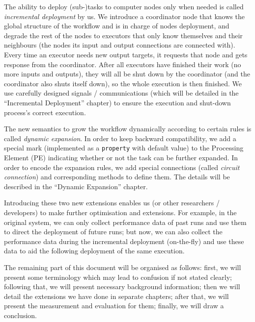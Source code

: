 The ability to deploy (sub-)tasks to computer nodes only when needed is called \emph{incremental deployment} by us. We introduce a coordinator node that knows the global structure of the workflow and is in charge of nodes deployment, and degrade the rest of the nodes to executors that only know themselves and their neighbours (\ie the nodes its input and output connections are connected with). Every time an executor needs new output targets, it requests that node and gets response from the coordinator. After all executors have finished their work (\ie no more inputs and outputs), they will all be shut down by the coordinator (and the coordinator also shuts itself down), so the whole execution is then finished. We use carefully designed signals / communications (which will be detailed in the ``Incremental Deployment'' chapter) to ensure the execution and shut-down process's correct execution.

The new semantics to grow the workflow dynamically according to certain rules is called \emph{dynamic expansion}. In order to keep backward compatibility, we add a special mark (implemented as a \lstinline|property| with default value) to the Processing Element (PE) indicating whether or not the task can be further expanded. In order to encode the expansion rules, we add special connections (called \emph{circuit connection}) and corresponding methods to define them. The details will be described in the ``Dynamic Expansion'' chapter.

Introducing these two new extensions enables us (or other researchers / developers) to make further optimisation and extensions. For example, in the original \dpy system, we can only collect performance data of past runs and use them to direct the deployment of future runs; but now, we can also collect the performance data during the incremental deployment (\ie on-the-fly) and use these data to aid the following deployment of the same execution.

The remaining part of this document will be organised as follows: first, we will present some terminology which may lead to confusion if not stated clearly; following that, we will present necessary background information; then we will detail the extensions we have done in separate chapters; after that, we will present the measurement and evaluation for them; finally, we will draw a conclusion.
